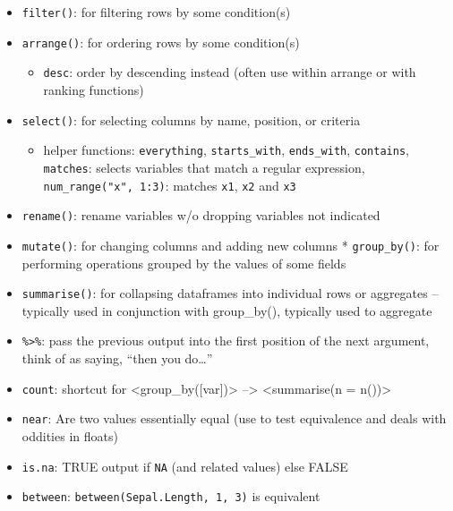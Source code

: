 \documentclass[]{book}
\providecommand{\tightlist}{%
  \setlength{\itemsep}{0pt}\setlength{\parskip}{0pt}}
\theoremstyle{definition}
\theoremstyle{definition}
\theoremstyle{definition}
\theoremstyle{remark}
\begin{document}
\begin{itemize}
\tightlist
\item
  \texttt{filter()}: for filtering rows by some condition(s)\\
\item
  \texttt{arrange()}: for ordering rows by some condition(s)

  \begin{itemize}
  \tightlist
  \item
    \texttt{desc}: order by descending instead (often use within arrange
    or with ranking functions)
  \end{itemize}
\item
  \texttt{select()}: for selecting columns by name, position, or
  criteria

  \begin{itemize}
  \tightlist
  \item
    helper functions: \texttt{everything}, \texttt{starts\_with},
    \texttt{ends\_with}, \texttt{contains}, \texttt{matches}: selects
    variables that match a regular expression,
    \texttt{num\_range("x",\ 1:3)}: matches \texttt{x1}, \texttt{x2} and
    \texttt{x3}
  \end{itemize}
\item
  \texttt{rename()}: rename variables w/o dropping variables not
  indicated
\item
  \texttt{mutate()}: for changing columns and adding new columns *
  \texttt{group\_by()}: for performing operations grouped by the values
  of some fields\\
\item
  \texttt{summarise()}: for collapsing dataframes into individual rows
  or aggregates -- typically used in conjunction with group\_by(),
  typically used to aggregate
\item
  \texttt{\%\textgreater{}\%}: pass the previous output into the first
  position of the next argument, think of as saying, ``then you
  do\ldots{}''\\
\item
  \texttt{count}: shortcut for
  \textless{}group\_by({[}var{]})\textgreater{} --\textgreater{}
  \textless{}summarise(n = n())\textgreater{}
\item
  \texttt{near}: Are two values essentially equal (use to test
  equivalence and deals with oddities in floats)
\item
  \texttt{is.na}: TRUE output if \texttt{NA} (and related values) else
  FALSE
\item
  \texttt{between}: \texttt{between(Sepal.Length,\ 1,\ 3)} is equivalent

\end{itemize}
\end{document}
